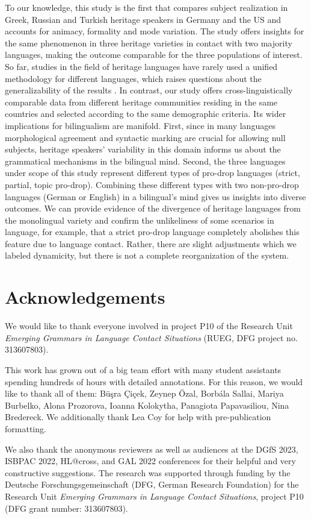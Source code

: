 \documentclass[output=paper,colorlinks,citecolor=brown]{langscibook}
\begin{document}
To our knowledge, this study is the first that compares subject realization in Greek, Russian and Turkish heritage speakers in Germany and the US and accounts for animacy, formality and mode variation. The study offers insights for the same phenomenon in three heritage varieties in contact with two majority languages, making the outcome comparable for the three populations of interest. So far, studies in the field of heritage languages have rarely used a unified methodology for different languages, which raises questions about the generalizability of the results \parencite{winter2021independence}. In contrast, our study offers cross-linguistically comparable data from different heritage communities residing in the same countries and selected according to the same demographic criteria. Its wider implications for bilingualism are manifold. First, since in many languages morphological agreement and syntactic marking are crucial for allowing null subjects, heritage speakers' variability in this domain informs us about the grammatical mechanisms in the bilingual mind. Second, the three languages under scope of this study represent different types of pro-drop languages (strict, partial, topic pro-drop). Combining these different types with two non-pro-drop languages (German or English) in a bilingual's mind gives us insights into diverse outcomes. We can provide evidence of the divergence of heritage languages from the monolingual variety and confirm the unlikeliness of some scenarios in language, for example, that a strict pro-drop language completely abolishes this feature due to language contact. Rather, there are slight adjustments which we labeled dynamicity, but there is not a complete reorganization of the system. 

\section*{Acknowledgements}
We would like to thank everyone involved in project P10 of the Research Unit \textit{Emerging Grammars in Language Contact Situations} (RUEG, DFG project no. 313607803).

This work has grown out of a big team effort with many student assistants spending hundreds of hours with detailed annotations. For this reason, we would like to thank all of them: Büşra Çiçek, Zeynep Özal, Borbála Sallai, Mariya Burbelko, Alona Prozorova, Ioanna Kolokytha, Panagiota Papavasiliou, Nina Bredereck. We additionally thank Lea Coy for help with pre-publication formatting.

We also thank the anonymous reviewers as well as audiences at the DGfS 2023, ISBPAC 2022, HL@cross, and GAL 2022 conferences for their helpful and very constructive suggestions.
The research was supported through funding by the Deutsche Forschungsgemeinschaft (DFG, German Research Foundation) for the Research Unit \textit{Emerging Grammars in Language Contact Situations}, project P10 (DFG grant number: 313607803).

\printbibliography[heading=subbibliography,notkeyword=this]
\end{document}
